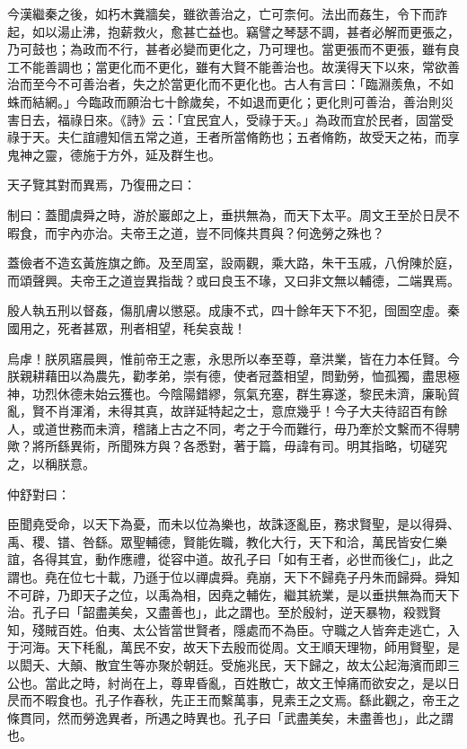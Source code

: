 \begin{pinyinscope}
今漢繼秦之後，如朽木糞牆矣，雖欲善治之，亡可柰何。法出而姦生，令下而詐起，如以湯止沸，抱薪救火，愈甚亡益也。竊譬之琴瑟不調，甚者必解而更張之，乃可鼓也；為政而不行，甚者必變而更化之，乃可理也。當更張而不更張，雖有良工不能善調也；當更化而不更化，雖有大賢不能善治也。故漢得天下以來，常欲善治而至今不可善治者，失之於當更化而不更化也。古人有言曰：「臨淵羨魚，不如蛛而結網。」今臨政而願治七十餘歲矣，不如退而更化；更化則可善治，善治則災害日去，福祿日來。《詩》云：「宜民宜人，受祿于天。」為政而宜於民者，固當受祿于天。夫仁誼禮知信五常之道，王者所當脩飭也；五者脩飭，故受天之祐，而享鬼神之靈，德施于方外，延及群生也。

天子覽其對而異焉，乃復冊之曰：

制曰：蓋聞虞舜之時，游於巖郎之上，垂拱無為，而天下太平。周文王至於日昃不暇食，而宇內亦治。夫帝王之道，豈不同條共貫與？何逸勞之殊也？

蓋儉者不造玄黃旌旗之飾。及至周室，設兩觀，乘大路，朱干玉戚，八佾陳於庭，而頌聲興。夫帝王之道豈異指哉？或曰良玉不瑑，又曰非文無以輔德，二端異焉。

殷人執五刑以督姦，傷肌膚以懲惡。成康不式，四十餘年天下不犯，囹圄空虛。秦國用之，死者甚眾，刑者相望，秏矣哀哉！

烏虖！朕夙寤晨興，惟前帝王之憲，永思所以奉至尊，章洪業，皆在力本任賢。今朕親耕藉田以為農先，勸孝弟，崇有德，使者冠蓋相望，問勤勞，恤孤獨，盡思極神，功烈休德未始云獲也。今陰陽錯繆，氛氣充塞，群生寡遂，黎民未濟，廉恥貿亂，賢不肖渾淆，未得其真，故詳延特起之士，意庶幾乎！今子大夫待詔百有餘人，或道世務而未濟，稽諸上古之不同，考之于今而難行，毋乃牽於文繫而不得騁歟？將所繇異術，所聞殊方與？各悉對，著于篇，毋諱有司。明其指略，切磋究之，以稱朕意。

仲舒對曰：

臣聞堯受命，以天下為憂，而未以位為樂也，故誅逐亂臣，務求賢聖，是以得舜、禹、稷、镨、咎繇。眾聖輔德，賢能佐職，教化大行，天下和洽，萬民皆安仁樂誼，各得其宜，動作應禮，從容中道。故孔子曰「如有王者，必世而後仁」，此之謂也。堯在位七十載，乃遜于位以禪虞舜。堯崩，天下不歸堯子丹朱而歸舜。舜知不可辟，乃即天子之位，以禹為相，因堯之輔佐，繼其統業，是以垂拱無為而天下治。孔子曰「韶盡美矣，又盡善也」，此之謂也。至於殷紂，逆天暴物，殺戮賢知，殘賊百姓。伯夷、太公皆當世賢者，隱處而不為臣。守職之人皆奔走逃亡，入于河海。天下秏亂，萬民不安，故天下去殷而從周。文王順天理物，師用賢聖，是以閎夭、大顛、散宜生等亦聚於朝廷。受施兆民，天下歸之，故太公起海濱而即三公也。當此之時，紂尚在上，尊卑昏亂，百姓散亡，故文王悼痛而欲安之，是以日昃而不暇食也。孔子作春秋，先正王而繫萬事，見素王之文焉。繇此觀之，帝王之條貫同，然而勞逸異者，所遇之時異也。孔子曰「武盡美矣，未盡善也」，此之謂也。


\end{pinyinscope}
